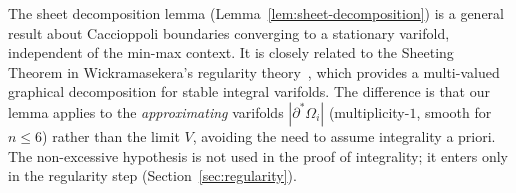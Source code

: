 \begin{remark}\label{rem:sheet-decomposition}
The sheet decomposition lemma (Lemma~\ref{lem:sheet-decomposition}) is a general result about Caccioppoli boundaries converging to a stationary varifold, independent of the min-max context. It is closely related to the Sheeting Theorem in Wickramasekera's regularity theory~\cite{Wic14}, which provides a multi-valued graphical decomposition for stable integral varifolds. The difference is that our lemma applies to the \emph{approximating} varifolds $|\partial^*\Omega_i|$ (multiplicity-$1$, smooth for $n \leq 6$) rather than the limit $V$, avoiding the need to assume integrality a priori. The non-excessive hypothesis is not used in the proof of integrality; it enters only in the regularity step (Section~\ref{sec:regularity}).
\end{remark}
